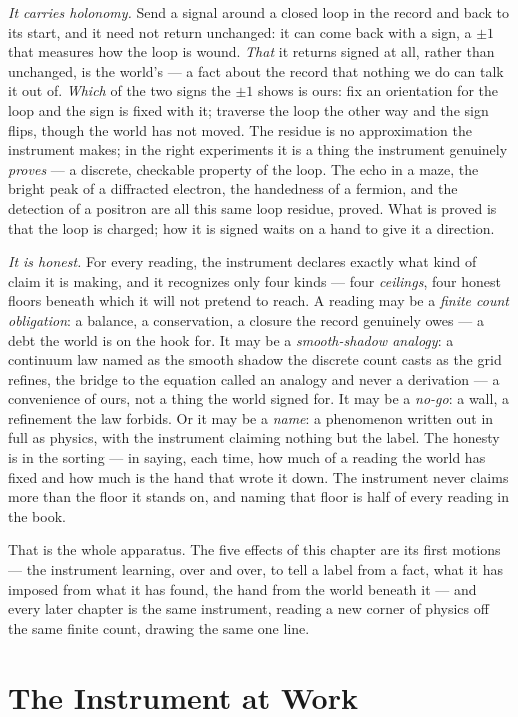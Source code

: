 \emph{It carries holonomy.} Send a signal around a closed loop in the record and back to its start, and it
need not return unchanged: it can come back with a sign, a $\pm 1$ that measures how the loop is wound.
\emph{That} it returns signed at all, rather than unchanged, is the world's --- a fact about the record that
nothing we do can talk it out of. \emph{Which} of the two signs the $\pm 1$ shows is ours: fix an orientation
for the loop and the sign is fixed with it; traverse the loop the other way and the sign flips, though the
world has not moved. The residue is no approximation the instrument makes; in the right experiments it is a
thing the instrument genuinely \emph{proves} --- a discrete, checkable property of the loop. The echo in a
maze, the bright peak of a diffracted electron, the handedness of a fermion, and the detection of a positron
are all this same loop residue, proved. What is proved is that the loop is charged; how it is signed waits on a
hand to give it a direction.

\emph{It is honest.} For every reading, the instrument declares exactly what kind of claim it is making, and it
recognizes only four kinds --- four \emph{ceilings}, four honest floors beneath which it will not pretend to
reach. A reading may be a \emph{finite count obligation}: a balance, a conservation, a closure the record
genuinely owes --- a debt the world is on the hook for. It may be a \emph{smooth-shadow analogy}: a continuum
law named as the smooth shadow the discrete count casts as the grid refines, the bridge to the equation called
an analogy and never a derivation --- a convenience of ours, not a thing the world signed for. It may be a
\emph{no-go}: a wall, a refinement the law forbids. Or it may be a \emph{name}: a phenomenon written out in
full as physics, with the instrument claiming nothing but the label. The honesty is in the sorting --- in
saying, each time, how much of a reading the world has fixed and how much is the hand that wrote it down. The
instrument never claims more than the floor it stands on, and naming that floor is half of every reading in the
book.

That is the whole apparatus. The five effects of this chapter are its first motions --- the instrument
learning, over and over, to tell a label from a fact, what it has imposed from what it has found, the hand from
the world beneath it --- and every later chapter is the same instrument, reading a new corner of physics off
the same finite count, drawing the same one line.

\section{The Instrument at Work}
\label{se:instrument-at-work}

